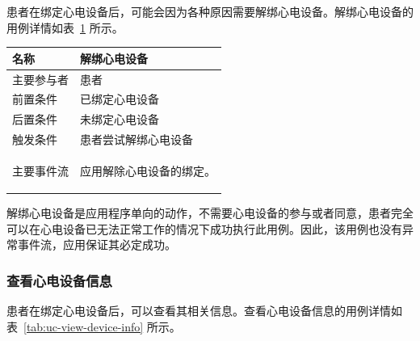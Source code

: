 患者在绑定心电设备后，可能会因为各种原因需要解绑心电设备。解绑心电设备的用例详情如表~\ref{tab:uc-unbind-device} 所示。

\begin{table}[!ht]
    \label{tab:uc-unbind-device}
    \begin{tabularx}{\textwidth}{|l|X|}
        \hline
        名称    & 解绑心电设备     \\
        \hline
        主要参与者 & 患者         \\
        \hline
        前置条件  & 已绑定心电设备    \\
        \hline
        后置条件  & 未绑定心电设备    \\
        \hline
        触发条件  & 患者尝试解绑心电设备 \\
        \hline
        主要事件流 &
        \begin{itemizec}
            \item[1.] 应用解除心电设备的绑定。
        \end{itemizec} \\
        \hline
    \end{tabularx}
\end{table}

解绑心电设备是应用程序单向的动作，不需要心电设备的参与或者同意，患者完全可以在心电设备已无法正常工作的情况下成功执行此用例。因此，该用例也没有异常事件流，应用保证其必定成功。

\subsubsection{查看心电设备信息}

患者在绑定心电设备后，可以查看其相关信息。查看心电设备信息的用例详情如表~\ref{tab:uc-view-device-info} 所示。

